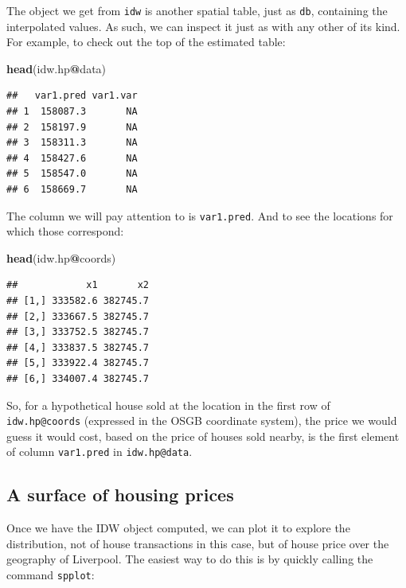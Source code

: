 \documentclass[]{book}
\newenvironment{Shaded}{\begin{snugshade}}{\end{snugshade}}
\newcommand{\KeywordTok}[1]{\textcolor[rgb]{0.13,0.29,0.53}{\textbf{#1}}}
\newcommand{\OperatorTok}[1]{\textcolor[rgb]{0.81,0.36,0.00}{\textbf{#1}}}
\newcommand{\NormalTok}[1]{#1}
\begin{document}
The object we get from \texttt{idw} is another spatial table, just as
\texttt{db}, containing the interpolated values. As such, we can inspect
it just as with any other of its kind. For example, to check out the top
of the estimated table:

\begin{Shaded}
\begin{Highlighting}[]
\KeywordTok{head}\NormalTok{(idw.hp}\OperatorTok{@}\NormalTok{data)}
\end{Highlighting}
\end{Shaded}

\begin{verbatim}
##   var1.pred var1.var
## 1  158087.3       NA
## 2  158197.9       NA
## 3  158311.3       NA
## 4  158427.6       NA
## 5  158547.0       NA
## 6  158669.7       NA
\end{verbatim}

The column we will pay attention to is \texttt{var1.pred}. And to see
the locations for which those correspond:

\begin{Shaded}
\begin{Highlighting}[]
\KeywordTok{head}\NormalTok{(idw.hp}\OperatorTok{@}\NormalTok{coords)}
\end{Highlighting}
\end{Shaded}

\begin{verbatim}
##            x1       x2
## [1,] 333582.6 382745.7
## [2,] 333667.5 382745.7
## [3,] 333752.5 382745.7
## [4,] 333837.5 382745.7
## [5,] 333922.4 382745.7
## [6,] 334007.4 382745.7
\end{verbatim}

So, for a hypothetical house sold at the location in the first row of
\texttt{idw.hp@coords} (expressed in the OSGB coordinate system), the
price we would guess it would cost, based on the price of houses sold
nearby, is the first element of column \texttt{var1.pred} in
\texttt{idw.hp@data}.

\subsection{A surface of housing
prices}\label{a-surface-of-housing-prices}

Once we have the IDW object computed, we can plot it to explore the
distribution, not of house transactions in this case, but of house price
over the geography of Liverpool. The easiest way to do this is by
quickly calling the command \texttt{spplot}:
\end{document}
